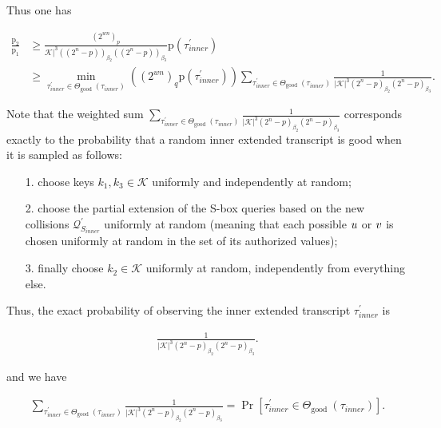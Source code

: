 Thus one has

$$
\begin{aligned}
\frac{\mathrm{p}_{2}}{\mathrm{p}_{1}} & \geq \frac{\left(2^{w n}\right)_{p}}{\mathcal{K}|^{3}\left((2^{n}-p)\right)_{\beta_{2}}\left((2^{n}-p)\right)_{\beta_{3}}} \mathrm{p}\left(\tau_{inner}^{\prime}\right)\\
& \geq \min _{\tau_{inner}^{\prime} \in \Theta_{\text {good }}(\tau_{inner})}\left(\left(2^{w n}\right)_{q} \mathrm{p}\left(\tau_{inner}^{\prime}\right)\right) \sum_{\tau_{inner}^{\prime} \in \Theta_{\text {good }}(\tau_{inner})} \frac{1}{|\mathcal{K}|^{3}\left(2^{n}-p\right)_{\beta_{2}}\left(2^{n}-p\right)_{\beta_{3}}}.
\end{aligned}
$$

Note that the weighted sum $\sum_{\tau_{inner}^{\prime} \in \Theta_{\text {good }}(\tau_{inner})} \frac{1}{|\mathcal{K}|^{3}\left(2^{n}-p\right)_{\beta_{2}}\left(2^{n}-p\right)_{\beta_{3}}}$ corresponds exactly to the probability that a random inner extended transcript is good when it is sampled as follows:

\begin{itemize}
  \item[1.]
  choose keys $k_{1}, k_{3} \in \mathcal{K}$  uniformly and independently at random;
  \item[2.]
  choose the partial extension of the S-box queries based on the new collisions $\mathcal{Q}_{S_{inner}}^{\prime}$ uniformly at random (meaning that each possible $\mathnormal{u}$ or $\mathnormal{v}$ is chosen uniformly at random in the set of its authorized values);
  \item[3.]
  finally choose $k_{2} \in \mathcal{K}$ uniformly at random, independently from everything else.
\end{itemize}

Thus, the exact probability of observing the inner extended transcript $\tau_{inner}^{\prime}$ is

$$
\begin{aligned}
\frac{1}{|\mathcal{K}|^{3}\left(2^{n}-p\right)_{\beta_{2}}\left(2^{n}-p\right)_{\beta_{3}}}.
\end{aligned}
$$

and we have

$$
\begin{aligned}
\sum_{\tau_{inner}^{\prime} \in \Theta_{\text {good }}(\tau_{inner})} \frac{1}{|\mathcal{K}|^{3}\left(2^{n}-p\right)_{\beta_{2}}\left(2^{n}-p\right)_{\beta_{3}}} = \operatorname{Pr}\left[ \tau_{inner}^{\prime} \in \Theta_{\text {good }}(\tau_{inner})\right].
\end{aligned}
$$

